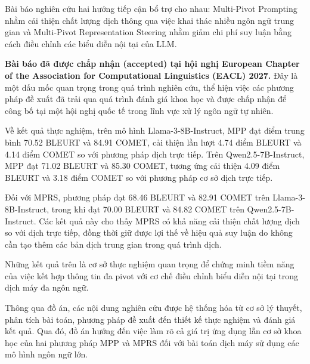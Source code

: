 Bài báo nghiên cứu hai hướng tiếp cận bổ trợ cho nhau: Multi-Pivot Prompting nhằm cải thiện chất lượng dịch thông qua việc khai thác nhiều ngôn ngữ trung gian và Multi-Pivot Representation Steering nhằm giảm chi phí suy luận bằng cách điều chỉnh các biểu diễn nội tại của LLM.

\textbf{Bài báo đã được chấp nhận (accepted) tại hội nghị European Chapter of the Association for Computational Linguistics (EACL) 2027.} Đây là một dấu mốc quan trọng trong quá trình nghiên cứu, thể hiện việc các phương pháp đề xuất đã trải qua quá trình đánh giá khoa học và được chấp nhận để công bố tại một hội nghị quốc tế trong lĩnh vực xử lý ngôn ngữ tự nhiên.

Về kết quả thực nghiệm, trên mô hình Llama-3-8B-Instruct, MPP đạt điểm trung bình 70.52 BLEURT và 84.91 COMET, cải thiện lần lượt 4.74 điểm BLEURT và 4.14 điểm COMET so với phương pháp dịch trực tiếp. Trên Qwen2.5-7B-Instruct, MPP đạt 71.02 BLEURT và 85.30 COMET, tương ứng cải thiện 4.09 điểm BLEURT và 3.18 điểm COMET so với phương pháp cơ sở dịch trực tiếp.

Đối với MPRS, phương pháp đạt 68.46 BLEURT và 82.91 COMET trên Llama-3-8B-Instruct, trong khi đạt 70.00 BLEURT và 84.82 COMET trên Qwen2.5-7B-Instruct. Các kết quả này cho thấy MPRS có khả năng cải thiện chất lượng dịch so với dịch trực tiếp, đồng thời giữ được lợi thế về hiệu quả suy luận do không cần tạo thêm các bản dịch trung gian trong quá trình dịch.

Những kết quả trên là cơ sở thực nghiệm quan trọng để chứng minh tiềm năng của việc kết hợp thông tin đa pivot với cơ chế điều chỉnh biểu diễn nội tại trong dịch máy đa ngôn ngữ.

Thông qua đồ án, các nội dung nghiên cứu được hệ thống hóa từ cơ sở lý thuyết, phân tích bài toán, phương pháp đề xuất đến thiết kế thực nghiệm và đánh giá kết quả. Qua đó, đồ án hướng đến việc làm rõ cả giá trị ứng dụng lẫn cơ sở khoa học của hai phương pháp MPP và MPRS đối với bài toán dịch máy sử dụng các mô hình ngôn ngữ lớn.
